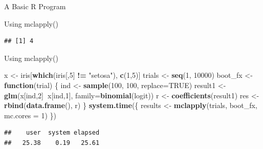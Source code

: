 \documentclass[ignorenonframetext,]{beamer}
\newenvironment{Shaded}{\begin{snugshade}}{\end{snugshade}}
\newcommand{\KeywordTok}[1]{\textcolor[rgb]{0.13,0.29,0.53}{\textbf{#1}}}
\newcommand{\DataTypeTok}[1]{\textcolor[rgb]{0.13,0.29,0.53}{#1}}
\newcommand{\DecValTok}[1]{\textcolor[rgb]{0.00,0.00,0.81}{#1}}
\newcommand{\StringTok}[1]{\textcolor[rgb]{0.31,0.60,0.02}{#1}}
\newcommand{\OtherTok}[1]{\textcolor[rgb]{0.56,0.35,0.01}{#1}}
\newcommand{\ControlFlowTok}[1]{\textcolor[rgb]{0.13,0.29,0.53}{\textbf{#1}}}
\newcommand{\OperatorTok}[1]{\textcolor[rgb]{0.81,0.36,0.00}{\textbf{#1}}}
\newcommand{\NormalTok}[1]{#1}
\begin{document}
\begin{frame}[fragile]{A Basic R Program}
\begin{block}{Using mclapply()}
\begin{verbatim}
## [1] 4
\end{verbatim}

\end{block}

\begin{block}{Using mclapply()}

\begin{Shaded}
\begin{Highlighting}[]
\NormalTok{x <-}\StringTok{ }\NormalTok{iris[}\KeywordTok{which}\NormalTok{(iris[,}\DecValTok{5}\NormalTok{] }\OperatorTok{!=}\StringTok{ "setosa"}\NormalTok{), }\KeywordTok{c}\NormalTok{(}\DecValTok{1}\NormalTok{,}\DecValTok{5}\NormalTok{)]}
\NormalTok{trials <-}\StringTok{ }\KeywordTok{seq}\NormalTok{(}\DecValTok{1}\NormalTok{, }\DecValTok{10000}\NormalTok{)}
\NormalTok{boot_fx <-}\StringTok{ }\ControlFlowTok{function}\NormalTok{(trial) \{}
\NormalTok{  ind <-}\StringTok{ }\KeywordTok{sample}\NormalTok{(}\DecValTok{100}\NormalTok{, }\DecValTok{100}\NormalTok{, }\DataTypeTok{replace=}\OtherTok{TRUE}\NormalTok{)}
\NormalTok{  result1 <-}\StringTok{ }\KeywordTok{glm}\NormalTok{(x[ind,}\DecValTok{2}\NormalTok{]}\OperatorTok{~}\NormalTok{x[ind,}\DecValTok{1}\NormalTok{], }\DataTypeTok{family=}\KeywordTok{binomial}\NormalTok{(logit))}
\NormalTok{  r <-}\StringTok{ }\KeywordTok{coefficients}\NormalTok{(result1)}
\NormalTok{  res <-}\StringTok{ }\KeywordTok{rbind}\NormalTok{(}\KeywordTok{data.frame}\NormalTok{(), r)}
\NormalTok{\}}
\KeywordTok{system.time}\NormalTok{(\{}
\NormalTok{  results <-}\StringTok{ }\KeywordTok{mclapply}\NormalTok{(trials, boot_fx, }\DataTypeTok{mc.cores =} \DecValTok{1}\NormalTok{)}
\NormalTok{\})}
\end{Highlighting}
\end{Shaded}

\begin{verbatim}
##    user  system elapsed 
##   25.38    0.19   25.61
\end{verbatim}

\end{block}

\end{frame}
\end{document}
